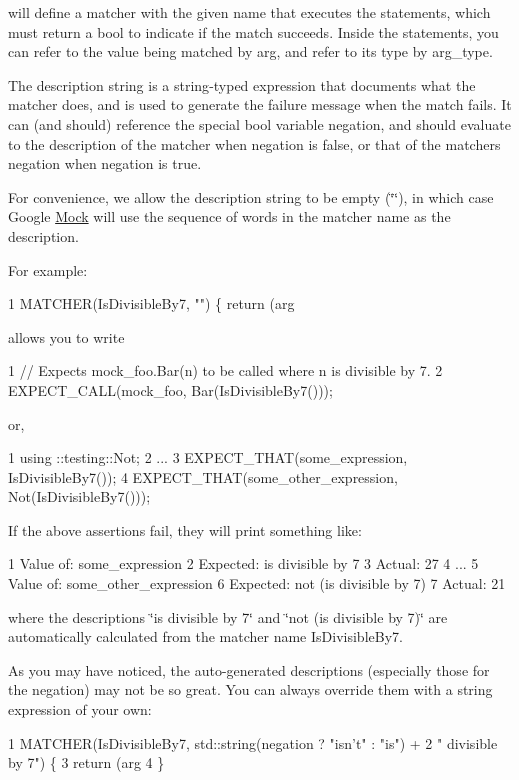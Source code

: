 will define a matcher with the given name that executes the statements, which must return a {\ttfamily bool} to indicate if the match succeeds. Inside the statements, you can refer to the value being matched by {\ttfamily arg}, and refer to its type by {\ttfamily arg\+\_\+type}.

The description string is a {\ttfamily string}-\/typed expression that documents what the matcher does, and is used to generate the failure message when the match fails. It can (and should) reference the special {\ttfamily bool} variable {\ttfamily negation}, and should evaluate to the description of the matcher when {\ttfamily negation} is {\ttfamily false}, or that of the matcher\textquotesingle{}s negation when {\ttfamily negation} is {\ttfamily true}.

For convenience, we allow the description string to be empty ({\ttfamily \char`\"{}\char`\"{}}), in which case Google \hyperlink{classMock}{Mock} will use the sequence of words in the matcher name as the description.

For example\+: 
\begin{DoxyCode}
1 MATCHER(IsDivisibleBy7, "") \{ return (arg %
\end{DoxyCode}
 allows you to write 
\begin{DoxyCode}
1 // Expects mock\_foo.Bar(n) to be called where n is divisible by 7.
2 EXPECT\_CALL(mock\_foo, Bar(IsDivisibleBy7()));
\end{DoxyCode}
 or, 
\begin{DoxyCode}
1 using ::testing::Not;
2 ...
3   EXPECT\_THAT(some\_expression, IsDivisibleBy7());
4   EXPECT\_THAT(some\_other\_expression, Not(IsDivisibleBy7()));
\end{DoxyCode}
 If the above assertions fail, they will print something like\+: 
\begin{DoxyCode}
1   Value of: some\_expression
2   Expected: is divisible by 7
3     Actual: 27
4 ...
5   Value of: some\_other\_expression
6   Expected: not (is divisible by 7)
7     Actual: 21
\end{DoxyCode}
 where the descriptions {\ttfamily \char`\"{}is divisible by 7\char`\"{}} and {\ttfamily \char`\"{}not (is divisible
by 7)\char`\"{}} are automatically calculated from the matcher name {\ttfamily Is\+Divisible\+By7}.

As you may have noticed, the auto-\/generated descriptions (especially those for the negation) may not be so great. You can always override them with a string expression of your own\+: 
\begin{DoxyCode}
1 MATCHER(IsDivisibleBy7, std::string(negation ? "isn't" : "is") +
2                         " divisible by 7") \{
3   return (arg %
4 \}
\end{DoxyCode}


